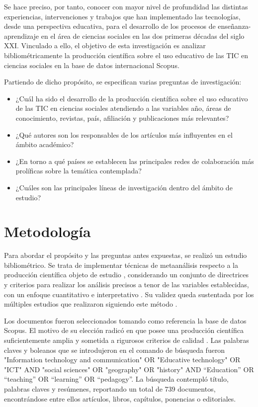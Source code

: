 \documentclass[spanish]{textolivre}
\begin{document}
Se hace preciso, por tanto, conocer con mayor nivel de profundidad las distintas experiencias, intervenciones y trabajos que han implementado las tecnologías, desde una perspectiva educativa, para el desarrollo de los procesos de enseñanza-aprendizaje en el área de ciencias sociales en las dos primeras décadas del siglo XXI. Vinculado a ello, el objetivo de esta investigación es analizar bibliométricamente la producción científica sobre el uso educativo de las TIC en ciencias sociales en la base de datos internacional Scopus.

Partiendo de dicho propósito, se especifican varias preguntas de investigación:

\begin{itemize}
    \item ¿Cuál ha sido el desarrollo de la producción científica sobre el uso educativo de las TIC en ciencias sociales atendiendo a las variables año, áreas de conocimiento, revistas, país, afiliación y publicaciones más relevantes? 
    \item ¿Qué autores son los responsables de los artículos más influyentes en el ámbito académico? 
    \item ¿En torno a qué países se establecen las principales redes de colaboración más prolíficas sobre la temática contemplada? 
    \item ¿Cuáles son las principales líneas de investigación dentro del ámbito de estudio?

\end{itemize}


\section{Metodología}

Para abordar el propósito y las preguntas antes expuestas, se realizó un estudio bibliométrico. Se trata de implementar técnicas de metaanálisis respecto a la producción científica objeto de estudio \cite{gonzalez2020quality}, considerando un conjunto de directrices y criterios para realizar los análisis precisos a tenor de las variables establecidas, con un enfoque cuantitativo e interpretativo \cite{civico2022twitter}. Su validez queda sustentada por los múltiples estudios que realizaron siguiendo este método \cite{boulahrouz2018digital, colomo2020spoc, colomo2022mooc, lopez2021co, mielgo2022revision, moreno2019estudio, ruiz2021revision}.

Los documentos fueron seleccionados tomando como referencia la base de datos Scopus. El motivo de su elección radicó en que posee una producción científica suficientemente amplia y sometida a rigurosos criterios de calidad \cite{khanra2020big}. Las palabras claves y boleanos que se introdujeron en el comando de búsqueda fueron "Information technology and communication" OR "Educative technology" OR "ICT" AND "social sciences" OR "geography" OR "history" AND “Education” OR “teaching” OR “learning” OR “pedagogy”. La búsqueda contempló título, palabras claves y resúmenes, reportando un total de 739 documentos, encontrándose entre ellos artículos, libros, capítulos, ponencias o editoriales.
\end{document}
